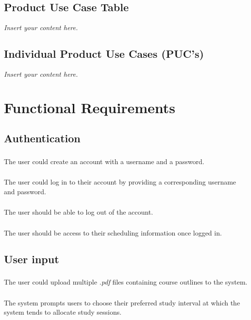 \documentclass[12pt]{article}
\newcommand{\lips}{\textit{Insert your content here.}}
\begin{document}
\subsection{Product Use Case Table}
\lips
\subsection{Individual Product Use Cases (PUC's)}
\lips

\section{Functional Requirements}
\subsection{Authentication}
\subsubsection{}
The user could create an account with a username and a password.
\subsubsection{}
The user could log in to their account by providing a corresponding username and password.
\subsubsection{}
The user should be able to log out of the account.
\subsubsection{}
The user should be access to their scheduling information once logged in.


\subsection{User input}
\subsubsection{}
The user could upload multiple \textit{.pdf} files containing course outlines to the system.
\subsubsection{}
The system prompts users to choose their preferred study interval at which the system tends to allocate study sessions.
\end{document}
